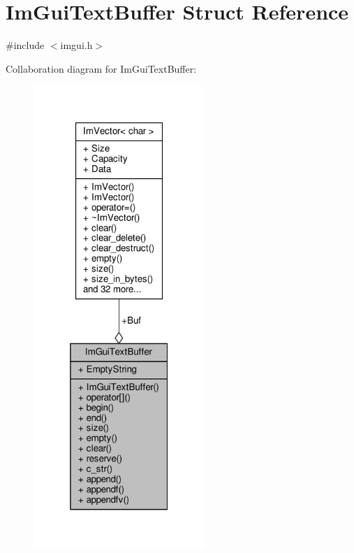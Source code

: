 \hypertarget{structImGuiTextBuffer}{}\section{Im\+Gui\+Text\+Buffer Struct Reference}
\label{structImGuiTextBuffer}


{\ttfamily \#include $<$imgui.\+h$>$}



Collaboration diagram for Im\+Gui\+Text\+Buffer\+:
\nopagebreak
\begin{figure}[H]
\begin{center}
\leavevmode
\includegraphics[width=184pt]{structImGuiTextBuffer__coll__graph}
\end{center}
\end{figure}
